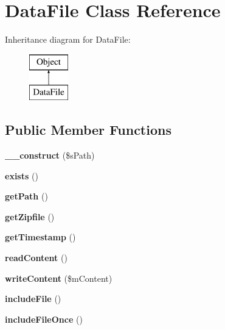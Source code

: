 \hypertarget{class_data_file}{\section{Data\-File Class Reference}
\label{class_data_file}
}
Inheritance diagram for Data\-File\-:\begin{figure}[H]
\begin{center}
\leavevmode
\includegraphics[height=2.000000cm]{class_data_file}
\end{center}
\end{figure}
\subsection*{Public Member Functions}
\begin{DoxyCompactItemize}
\item 
\hypertarget{class_data_file_af0729d766ccaf697282098d388613e27}{{\bfseries \-\_\-\-\_\-construct} (\$s\-Path)}\label{class_data_file_af0729d766ccaf697282098d388613e27}

\item 
\hypertarget{class_data_file_a57668f96698d42ddfb0828b1d08db452}{{\bfseries exists} ()}\label{class_data_file_a57668f96698d42ddfb0828b1d08db452}

\item 
\hypertarget{class_data_file_a9ef2d04a9e8c4af792d05c9188bcfa58}{{\bfseries get\-Path} ()}\label{class_data_file_a9ef2d04a9e8c4af792d05c9188bcfa58}

\item 
\hypertarget{class_data_file_a4f2cb91383402c38c9781d1ae76c1373}{{\bfseries get\-Zipfile} ()}\label{class_data_file_a4f2cb91383402c38c9781d1ae76c1373}

\item 
\hypertarget{class_data_file_ab0887ec33494284dc38021e9883f781b}{{\bfseries get\-Timestamp} ()}\label{class_data_file_ab0887ec33494284dc38021e9883f781b}

\item 
\hypertarget{class_data_file_ade4046ade12829201f08c7c821b0ffa9}{{\bfseries read\-Content} ()}\label{class_data_file_ade4046ade12829201f08c7c821b0ffa9}

\item 
\hypertarget{class_data_file_aa8ba938d7d132e802c6ce139a89b8702}{{\bfseries write\-Content} (\$m\-Content)}\label{class_data_file_aa8ba938d7d132e802c6ce139a89b8702}

\item 
\hypertarget{class_data_file_aad6397e069c53642e0624af741337f68}{{\bfseries include\-File} ()}\label{class_data_file_aad6397e069c53642e0624af741337f68}

\item 
\hypertarget{class_data_file_af996dbc2b2bcfddb20a98be25bc7555e}{{\bfseries include\-File\-Once} ()}\label{class_data_file_af996dbc2b2bcfddb20a98be25bc7555e}

\end{DoxyCompactItemize}
